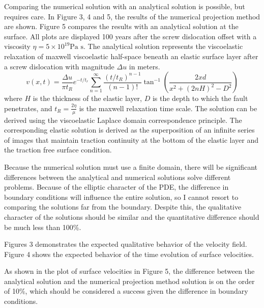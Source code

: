\documentclass[a4paper]{article}
\begin{document}
Comparing the numerical solution with an analytical solution is possible, but requires care. In Figure 3, 4 and 5, the results of the numerical projection method are shown. Figure 5 compares the results with an analytical solution at the surface. All plots are displayed 100 years after the screw dislocation offset with a
viscosity $\eta = 5 \times 10 ^ 19 \textrm{Pa s}$.
The analytical solution represents the viscoelastic relaxation of maxwell viscoelastic half-space beneath an elastic surface layer after a screw dislocation
with magnitude $\Delta u$ in meters.
\begin{equation}
    v(x, t) = \frac{\Delta u}{\pi t_R} e ^{-t/t_r} \sum_{n=1}^{\infty} \frac{(t/t_R)^{n-1}}{(n-1)!} \tan^{-1}\left(\frac{2xd}{x^2 + (2nH)^2 - D^2}\right)
    \label{analytical}
\end{equation}
where $H$ is the thickness of the elastic layer, $D$ is the depth to which the fault penetrates, and $t_R = \frac{2\eta}{\mu}$ is the maxwell relaxation
time scale. The solution can be derived using the viscoelastic Laplace domain correspondence principle. The corresponding elastic solution is derived as 
the superposition of an infinite series of images that maintain traction continuity at the bottom of the elastic layer and the traction free surface condition.

Because the numerical solution must use a finite domain, there will be significant differences between the analytical and numerical solutions solve different problems.
Because of the elliptic character of the PDE, the difference in boundary conditions will influence the entire solution, so I cannot resort
to comparing the solutions far from the boundary.
Despite this, the qualitative character of the solutions should be similar and the quantitative difference should be much less than 100\%. 

Figures 3 demonstrates the expected qualitative behavior of the velocity field. Figure 4 shows the expected behavior of the time evolution of
surface velocities. 

As shown in the plot of surface velocities in Figure 5, the difference between the analytical solution
and the numerical projection method solution is on the order of 10\%, which should be considered a success given the
difference in boundary conditions.
\end{document}
